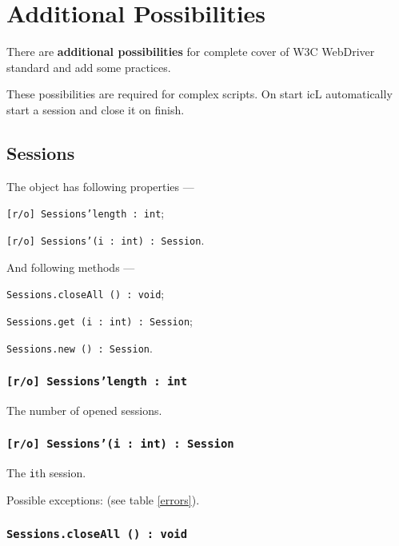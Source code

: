 

\section{Additional Possibilities}

There are {\bf additional possibilities} for complete cover of W3C WebDriver standard and add some practices.

These possibilities are required for complex scripts. On start icL automatically start a session and close it on finish.

\subsection{Sessions}

The object \sessions{} has following properties —
\begin{icItems}
	\item \texttt{[r/o] Sessions'length : int};
	\item \texttt{[r/o] Sessions'(i : int) : Session}.
\end{icItems}

And following methods —
\begin{icItems}
	\item \texttt{Sessions.closeAll () : void};
	\item \texttt{Sessions.get (i : int) : Session};
	\item \texttt{Sessions.new () : Session}.
\end{icItems}

\subsubsection{\texttt{[r/o] Sessions'length : int}}

The number of opened sessions.

\subsubsection{\texttt{[r/o] Sessions'(i : int) : Session}}

The \texttt{i}th session.

Possible exceptions:  (see table \ref{errors}).

\subsubsection{\texttt{Sessions.closeAll () : void}}

